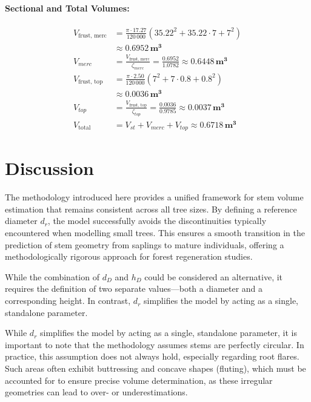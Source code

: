 \documentclass[twocolumn, bibliography=totoc]{scrartcl}
\begin{document}
\paragraph{Sectional and Total Volumes:}
\begin{equation}
  \begin{aligned}
    V_{\text{frust, merc}} &= \frac{\pi \cdot 17.27}{120\,000} \left( 35.22^2 + 35.22 \cdot 7 + 7^2 \right) \\
    &\approx \mathbf{0.6952\,\text{m}^3} \\
    V_{merc} &= \frac{V_{\text{frust, merc}}}{\zeta_{merc}} = \frac{0.6952}{1.0782} \approx \mathbf{0.6448 \, \unit{m^3}} \\
     V_{\text{frust, top}} &= \frac{\pi \cdot 2.50}{120\,000} \left( 7^2 + 7 \cdot 0.8 + 0.8^2 \right) \\
    &\approx \mathbf{0.0036\,\text{m}^3} \\
    V_{top} &= \frac{V_{\text{frust, top}}}{\zeta_{top}} = \frac{0.0036}{0.9785} \approx \mathbf{0.0037 \, \unit{m^3}} \\
    V_{\text{total}} &= V_{st} + V_{merc} + V_{top} \approx \mathbf{0.6718 \, \unit{m^3}}
\end{aligned}
\end{equation}


\section{Discussion}

The methodology introduced here provides a unified framework for stem volume estimation that remains consistent across all tree sizes. By defining a reference diameter $d_r$, the model successfully avoids the discontinuities typically encountered when modelling small trees. This ensures a smooth transition in the prediction of stem geometry from saplings to mature individuals, offering a methodologically rigorous approach for forest regeneration studies. 

While the combination of $d_D$ and $h_D$ could be considered an alternative, it requires the definition of two separate values—both a diameter and a corresponding height. In contrast, $d_r$ simplifies the model by acting as a single, standalone parameter.

While $d_r$ simplifies the model by acting as a single, standalone parameter, it is important to note that the methodology assumes stems are perfectly circular. In practice, this assumption does not always hold, especially regarding root flares. Such areas often exhibit buttressing and concave shapes (fluting), which must be accounted for to ensure precise volume determination, as these irregular geometries can lead to over- or underestimations.
\end{document}

